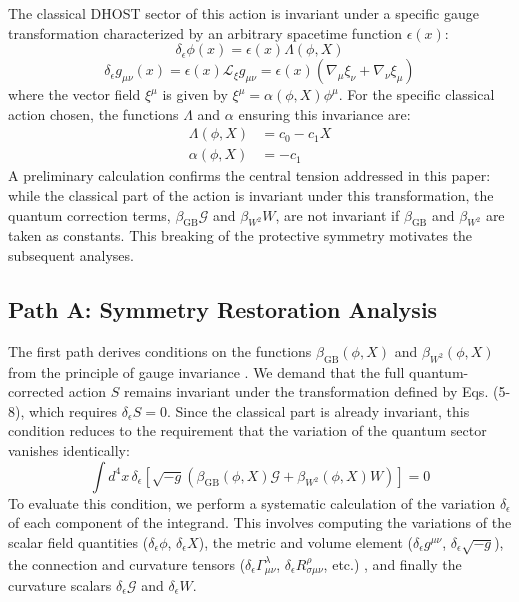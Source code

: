 \documentclass[twocolumn]{aastex631}
\begin{document}
The classical DHOST sector of this action is invariant under a specific gauge transformation characterized by an arbitrary spacetime function $\epsilon(x)$:
\begin{equation}
\delta_\epsilon \phi(x) = \epsilon(x) \Lambda(\phi, X)
\end{equation}
\begin{equation}
\delta_\epsilon g_{\mu\nu}(x) = \epsilon(x) \mathcal{L}_{\xi} g_{\mu\nu} = \epsilon(x) (\nabla_\mu \xi_\nu + \nabla_\nu \xi_\mu)
\end{equation}
\citep{pound2024blackholeperturbationtheory}
where the vector field $\xi^\mu$ is given by $\xi^\mu = \alpha(\phi, X) \phi^\mu$. For the specific classical action chosen, the functions $\Lambda$ and $\alpha$ ensuring this invariance are:
\begin{align}
\Lambda(\phi, X) &= c_0 - c_1 X \\
\alpha(\phi, X) &= -c_1
\end{align}
A preliminary calculation confirms the central tension addressed in this paper: while the classical part of the action is invariant under this transformation, the quantum correction terms, $\beta_{\text{GB}}\mathcal{G}$ and $\beta_{W^2}W$, are not invariant if $\beta_{\text{GB}}$ and $\beta_{W^2}$ are taken as constants. This breaking of the protective symmetry motivates the subsequent analyses.

\subsection{Path A: Symmetry Restoration Analysis}
The first path derives conditions on the functions $\beta_{\text{GB}}(\phi, X)$ and $\beta_{W^2}(\phi, X)$ from the principle of gauge invariance \citep{savasta2020gaugeprinciplegaugeinvariance}. We demand that the full quantum-corrected action $S$ remains invariant under the transformation defined by Eqs. (5-8), which requires $\delta_\epsilon S = 0$. Since the classical part is already invariant, this condition reduces to the requirement that the variation of the quantum sector vanishes identically:
\begin{equation}
\int d^4x \, \delta_\epsilon \left[ \sqrt{-g} \left( \beta_{\text{GB}}(\phi, X) \mathcal{G} + \beta_{W^2}(\phi, X) W \right) \right] = 0
\end{equation}
To evaluate this condition, we perform a systematic calculation of the variation $\delta_\epsilon$ of each component of the integrand. This involves computing the variations of the scalar field quantities ($\delta_\epsilon \phi$, $\delta_\epsilon X$), the metric and volume element ($\delta_\epsilon g^{\mu\nu}$, $\delta_\epsilon \sqrt{-g}$), the connection and curvature tensors ($\delta_\epsilon \Gamma^\lambda_{\mu\nu}$, $\delta_\epsilon R^\rho_{\sigma\mu\nu}$, etc.) \citep{davis1996symmetricvariationsmetricextrema,guarnizo2010boundarytermmetricfr,tamanini2012variationalapproachgravitationaltheories}, and finally the curvature scalars $\delta_\epsilon \mathcal{G}$ and $\delta_\epsilon W$.
\end{document}
